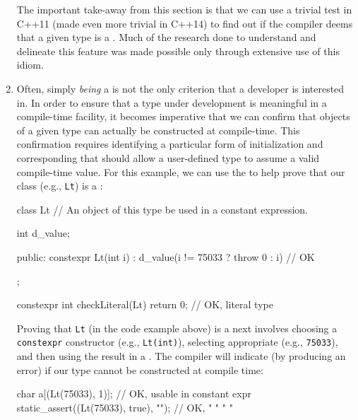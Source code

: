 \begin{enumerate}
{The important take-away from this section is that we can use a trivial
test in C++11 (made even more trivial in C++14) to find out if the
compiler deems that a given type is a . Much of the
research done to understand and delineate this feature was made possible
only through extensive use of this  idiom.}

\item{Often, simply \emph{being} a  is not the only criterion that a developer is interested in. In order to ensure that a type under development is meaningful in a compile-time facility, it becomes imperative that we can confirm that objects of a given type can actually be constructed at compile-time. This confirmation requires identifying a particular form of initialization and corresponding  that should allow a user-defined type to assume a valid compile-time value. For this example, we can use the  to help prove that our class (e.g., \lstinline!Lt!) is a :

\begin{emcppslisting}[emcppsbatch=e10]
class Lt  // An object of this type be used in a constant expression.
{
    int d_value;

public:
    constexpr Lt(int i) : d_value(i != 75033 ? throw 0 : i) { }  // OK
};

constexpr int checkLiteral(Lt) { return 0; }  // OK, literal type
\end{emcppslisting}


\noindent Proving that \lstinline!Lt! (in the code example above) is a
 next involves choosing a
\lstinline!constexpr! constructor (e.g., \lstinline!Lt(int)!), selecting
appropriate  (e.g., \lstinline!75033!), and then
using the result in a . The compiler will
indicate (by producing an error) if our type cannot be constructed at
compile time:

\begin{emcppslisting}[emcppsbatch=e10]
char a[(Lt(75033), 1)];               // OK, usable in constant expr
static_assert((Lt(75033), true), ""); // OK,   "    "     "       "
\end{emcppslisting}


}
\end{enumerate}
